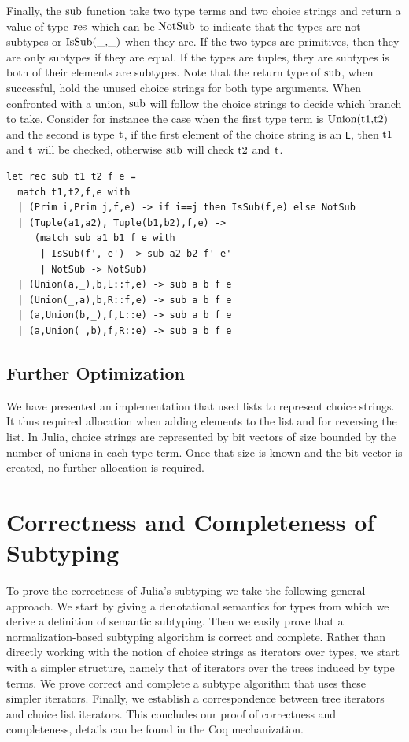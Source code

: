 \documentclass[a4paper,english]{lipics-v2019}
\renewcommand{\L}{{\tt L}\xspace}
\renewcommand{\c}[1]{\ensuremath{\text{\lstinline{#1}}}\xspace}
\begin{document}
\noindent
Finally, the \c{sub} function take two type terms and two choice strings and
return a value of type \c{res} which can be \c{NotSub} to indicate that the
types are not subtypes or \c{IsSub(_,_)} when they are.  If the two types
are primitives, then they are only subtypes if they are equal.  If the types
are tuples, they are subtypes is both of their elements are subtypes. Note
that the return type of \c{sub}, when successful, hold the unused choice
strings for both type arguments. When confronted with a union, \c{sub} will
follow the choice strings to decide which branch to take. Consider for
instance the case when the first type term is \c{Union(t1,t2)} and the
second is type \c{t}, if the first element of the choice string is an \L,
then \c{t1} and \c{t} will be checked, otherwise \c{sub} will check \c{t2}
and \c{t}.

\begin{lstlisting}
let rec sub t1 t2 f e =
  match t1,t2,f,e with 
  | (Prim i,Prim j,f,e) -> if i==j then IsSub(f,e) else NotSub
  | (Tuple(a1,a2), Tuple(b1,b2),f,e) ->
     (match sub a1 b1 f e with
      | IsSub(f', e') -> sub a2 b2 f' e'
      | NotSub -> NotSub)
  | (Union(a,_),b,L::f,e) -> sub a b f e
  | (Union(_,a),b,R::f,e) -> sub a b f e
  | (a,Union(b,_),f,L::e) -> sub a b f e
  | (a,Union(_,b),f,R::e) -> sub a b f e
\end{lstlisting}

\subsection{Further Optimization}

We have presented an implementation that used lists to represent choice
strings. It thus required allocation when adding elements to the list and
for reversing the list. In Julia, choice strings are represented by bit
vectors of size bounded by the number of unions in each type term.  Once
that size is known and the bit vector is created, no further allocation is
required.
\newpage

\section{Correctness and Completeness of Subtyping}

To prove the correctness of Julia's subtyping we take the following general
approach. We start by giving a denotational semantics for types from which
we derive a definition of semantic subtyping. Then we easily prove that a
normalization-based subtyping algorithm is correct and complete. Rather than
directly working with the notion of choice strings as iterators over types,
we start with a simpler structure, namely that of iterators over the trees
induced by type terms. We prove correct and complete a subtype algorithm
that uses these simpler iterators. Finally, we establish a correspondence 
between tree iterators and choice list iterators. This concludes our proof
of correctness and completeness, details can be found in the Coq
mechanization.
\end{document}
